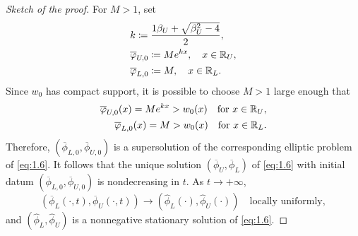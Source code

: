 \begin{proof}[Sketch of the proof]
    For \(M > 1\), set 
    \begin{align*}
        &k \coloneqq \frac{1\beta_U + \sqrt{\beta_U^2 - 4}}{2}, \\
        &\overline{\varphi}_{U,0} \coloneqq M e^{kx}, \quad x \in \mathbb{R}_U, \\
        &\overline{\varphi}_{L,0} \coloneqq M, \quad x \in \mathbb{R}_L.
    \end{align*}
    Since \(w_0\) has compact support, it is possible to choose \(M > 1\) large enough that
    \begin{align*}
        \overline{\varphi}_{U,0}(x) = M e^{kx} > w_0(x) \quad \text{for } x \in \mathbb{R}_U, \\
        \overline{\varphi}_{L,0}(x) = M > w_0(x) \quad \text{for } x \in \mathbb{R}_L. 
   \end{align*}
   Therefore, \((\overline{\phi}_{L,0}, \overline{\phi}_{U,0})\) is a supersolution of the corresponding elliptic problem of \eqref{eq:1.6}. It follows that the unique solution \((\overline{\phi}_U, \overline{\phi}_L)\) of \eqref{eq:1.6} with initial datum \((\overline{\phi}_{L,0}, \overline{\phi}_{U,0})\) is nondecreasing in \(t\).  As \(t \to +\infty\),
   \[
         (\overline{\phi}_L(\cdot, t), \overline{\phi}_U(\cdot, t)) \to (\hat{\phi}_L(\cdot), \hat{\phi}_U(\cdot)) \quad \text{locally uniformly},
   \]
   and \((\hat{\phi}_L, \hat{\phi}_U)\) is a nonnegative stationary solution of \eqref{eq:1.6}.
\end{proof}